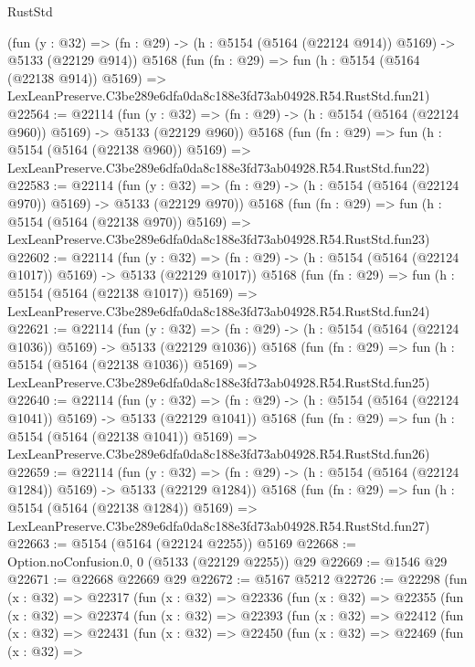 \begin{lexlean}{RustStd}
\begin{coremodule}
    (fun (y : @32) => (fn : @29) -> (h : @5154 (@5164 (@22124 @914)) @5169) -> @5133 (@22129 @914))
    @5168
    (fun (fn : @29) =>
    fun (h : @5154 (@5164 (@22138 @914)) @5169) =>
    LexLeanPreserve.C3be289e6dfa0da8c188e3fd73ab04928.R54.RustStd.fun21)
@22564 := @22114
    (fun (y : @32) => (fn : @29) -> (h : @5154 (@5164 (@22124 @960)) @5169) -> @5133 (@22129 @960))
    @5168
    (fun (fn : @29) =>
    fun (h : @5154 (@5164 (@22138 @960)) @5169) =>
    LexLeanPreserve.C3be289e6dfa0da8c188e3fd73ab04928.R54.RustStd.fun22)
@22583 := @22114
    (fun (y : @32) => (fn : @29) -> (h : @5154 (@5164 (@22124 @970)) @5169) -> @5133 (@22129 @970))
    @5168
    (fun (fn : @29) =>
    fun (h : @5154 (@5164 (@22138 @970)) @5169) =>
    LexLeanPreserve.C3be289e6dfa0da8c188e3fd73ab04928.R54.RustStd.fun23)
@22602 := @22114
    (fun (y : @32) =>
    (fn : @29) -> (h : @5154 (@5164 (@22124 @1017)) @5169) -> @5133 (@22129 @1017))
    @5168
    (fun (fn : @29) =>
    fun (h : @5154 (@5164 (@22138 @1017)) @5169) =>
    LexLeanPreserve.C3be289e6dfa0da8c188e3fd73ab04928.R54.RustStd.fun24)
@22621 := @22114
    (fun (y : @32) =>
    (fn : @29) -> (h : @5154 (@5164 (@22124 @1036)) @5169) -> @5133 (@22129 @1036))
    @5168
    (fun (fn : @29) =>
    fun (h : @5154 (@5164 (@22138 @1036)) @5169) =>
    LexLeanPreserve.C3be289e6dfa0da8c188e3fd73ab04928.R54.RustStd.fun25)
@22640 := @22114
    (fun (y : @32) =>
    (fn : @29) -> (h : @5154 (@5164 (@22124 @1041)) @5169) -> @5133 (@22129 @1041))
    @5168
    (fun (fn : @29) =>
    fun (h : @5154 (@5164 (@22138 @1041)) @5169) =>
    LexLeanPreserve.C3be289e6dfa0da8c188e3fd73ab04928.R54.RustStd.fun26)
@22659 := @22114
    (fun (y : @32) =>
    (fn : @29) -> (h : @5154 (@5164 (@22124 @1284)) @5169) -> @5133 (@22129 @1284))
    @5168
    (fun (fn : @29) =>
    fun (h : @5154 (@5164 (@22138 @1284)) @5169) =>
    LexLeanPreserve.C3be289e6dfa0da8c188e3fd73ab04928.R54.RustStd.fun27)
@22663 := @5154 (@5164 (@22124 @2255)) @5169
@22668 := Option.noConfusion.{0, 0} (@5133 (@22129 @2255)) @29
@22669 := @1546 @29
@22671 := @22668 @22669 @29
@22672 := @5167 @5212
@22726 := @22298
    (fun (x : @32) =>
    @22317
      (fun (x : @32) =>
      @22336
        (fun (x : @32) =>
        @22355
          (fun (x : @32) =>
          @22374
            (fun (x : @32) =>
            @22393
              (fun (x : @32) =>
              @22412
                (fun (x : @32) =>
                @22431
                  (fun (x : @32) =>
                  @22450
                    (fun (x : @32) =>
                    @22469
                      (fun (x : @32) =>

\end{coremodule}
\end{lexlean}
